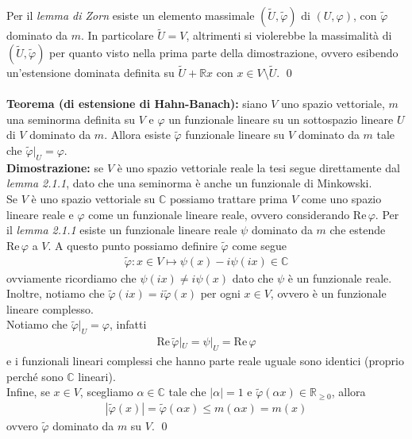 \documentclass{article}
\numberwithin{equation}{subsection}
\begin{document}
Per il \textit{lemma di Zorn} esiste un elemento massimale $(\widetilde{U}, \widetilde{\varphi})$ di $(U, \varphi)$, con $\widetilde{\varphi}$ dominato da $m$. In particolare $\widetilde{U} = V$, altrimenti si violerebbe la massimalità di $(\widetilde{U}, \widetilde{\varphi})$ per quanto visto nella prima parte della dimostrazione, ovvero esibendo un'estensione dominata definita su $\widetilde{U} + \mathbb{R}x$ con $x \in V \setminus \widetilde{U}$. \qed \\ \\
\textbf{Teorema (di estensione di Hahn-Banach):} siano $V$ uno spazio vettoriale, $m$ una seminorma definita su $V$ e $\varphi$ un funzionale lineare su un sottospazio lineare $U$ di $V$ dominato da $m$. Allora esiste $\widetilde{\varphi}$ funzionale lineare su $V$ dominato da $m$ tale che $\widetilde{\varphi}|_U = \varphi$. \\

\textbf{Dimostrazione:} se $V$ è uno spazio vettoriale reale la tesi segue direttamente dal \textit{lemma 2.1.1}, dato che una seminorma è anche un funzionale di Minkowski. \\
Se $V$ è uno spazio vettoriale su $\mathbb{C}$ possiamo trattare prima $V$ come uno spazio lineare reale e $\varphi$ come un funzionale lineare reale, ovvero considerando $\mathrm{Re} \, \varphi$. Per il \textit{lemma 2.1.1} esiste un funzionale lineare reale $\psi$ dominato da $m$ che estende $\mathrm{Re} \, \varphi$ a $V$. A questo punto possiamo definire $\widetilde{\varphi}$ come segue
\begin{align*}
    \widetilde{\varphi} : x \in V \mapsto \psi(x) - i\psi(ix) \in \mathbb{C} 
\end{align*}
ovviamente ricordiamo che $\psi(ix) \neq i\psi(x)$ dato che $\psi$ è un funzionale reale. Inoltre, notiamo che $\widetilde{\varphi}(ix) = i\widetilde{\varphi}(x)$ per ogni $x \in V$, ovvero è un funzionale lineare complesso. \\
Notiamo che $\widetilde{\varphi}|_U = \varphi$, infatti
\begin{align*}
    \mathrm{Re} \, \widetilde{\varphi}|_U = \psi|_U =\mathrm{Re} \, \varphi
\end{align*}
e i funzionali lineari complessi che hanno parte reale uguale sono identici (proprio perché sono $\mathbb{C}$ lineari). \\
Infine, se $x \in V$, scegliamo $\alpha \in \mathbb{C}$ tale che $|\alpha| = 1$ e $\widetilde{\varphi}(\alpha x) \in \mathbb{R}_{\geq 0}$, allora
\begin{align*}
    |\widetilde{\varphi}(x)| = \widetilde{\varphi}(\alpha x) \leq m(\alpha x) = m(x)
\end{align*}
ovvero $\widetilde{\varphi}$ dominato da $m$ su $V$. \qed
\end{document}
